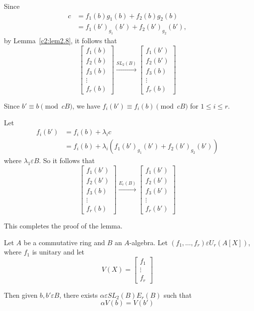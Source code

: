 \begin{Proof}
Since 
\begin{align*}
c&=f_1(b)g_1(b)+f_2(b)g_2(b)\\
&=f_1(b')_{g_1}(b')+f_2(b')_{g_2}(b'),
\end{align*}
by Lemma~\ref{c2:lem2.8}, it follows that 
$$
\begin{bmatrix}
f_1(b)\\
f_2(b)\\
f_3(b)\\
\vdots\\
f_r(b)
\end{bmatrix} \xrightarrow{SL_2(B)} \begin{bmatrix}
f_1(b')\\
f_2(b')\\
f_3(b)\\
\vdots\\
f_r(b)
\end{bmatrix}
$$

Since $b'\equiv b\pmod{cB}$, we have $f_i(b')\equiv f_i(b)\pmod{cB}$
for $1\leq i\leq r$. 

Let 
\begin{align*}
f_i(b')&=f_i(b)+\lambda_ic\\
&=f_i(b)+\lambda_i(f_1(b')_{g_1}(b')+f_2(b')_{g_2}(b'))
\end{align*}
where $\lambda_1\varepsilon B$. So it follows that 
$$
\begin{bmatrix}
f_1(b')\\
f_2(b')\\
f_3(b)\\
\vdots\\
f_r(b)
\end{bmatrix}\xrightarrow{E_r(B)} \begin{bmatrix}
f_1(b')\\
f_2(b')\\
f_3(b')\\
\vdots\\
f_r(b')
\end{bmatrix}
$$

This completes the proof of the lemma.
\enprf
\end{Proof}


\begin{thm}\label{c2:thm2.11}
Let $A$ be a commutative ring and $B$ an $A$-algebra. Let
$(f_1,\ldots,f_r)\varepsilon U_r(A[X])$, where $f_1$ is unitary and
let 
$$
V(X)=
\begin{bmatrix}
f_1\\
\vdots\\
f_r
\end{bmatrix}
$$

Then given $b,b'\varepsilon B$, there exists $\alpha \varepsilon
SL_2(B)E_r(B)$ such that 
$$
\alpha V(b)=V(b')
$$
\end{thm}

